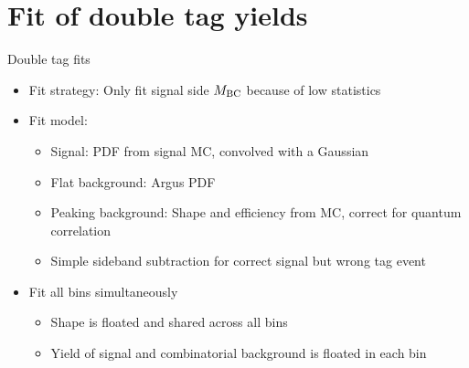 \documentclass{beamer}
\begin{document}
\section{Fit of double tag yields}
\begin{frame}{Double tag fits}
  \begin{itemize}
    \setlength\itemsep{1.0em}
    \item{Fit strategy: Only fit signal side $M_{\rm BC}$ because of low statistics}
    \item{Fit model:}
    \begin{itemize}
      \item{Signal: PDF from signal MC, convolved with a Gaussian}
      \item{Flat background: Argus PDF}
      \item{Peaking background: Shape and efficiency from MC, correct for quantum correlation}
      \item{Simple sideband subtraction for correct signal but wrong tag event}
    \end{itemize}
    \item{Fit all bins simultaneously}
    \begin{itemize}
      \item{Shape is floated and shared across all bins}
      \item{Yield of signal and combinatorial background is floated in each bin}
    \end{itemize}
  \end{itemize}
\end{frame}
\end{document}
